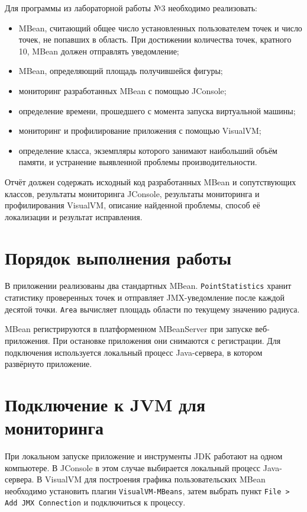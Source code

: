 \documentclass[a4paper,14pt]{extarticle}
\begin{document}
Для программы из лабораторной работы №3 необходимо реализовать:
\begin{itemize}
    \item MBean, считающий общее число установленных пользователем точек и число точек, не попавших в область. При достижении количества точек, кратного 10, MBean должен отправлять уведомление;
    \item MBean, определяющий площадь получившейся фигуры;
    \item мониторинг разработанных MBean с помощью JConsole;
    \item определение времени, прошедшего с момента запуска виртуальной машины;
    \item мониторинг и профилирование приложения с помощью VisualVM;
    \item определение класса, экземпляры которого занимают наибольший объём памяти, и устранение выявленной проблемы производительности.
\end{itemize}

Отчёт должен содержать исходный код разработанных MBean и сопутствующих классов, результаты мониторинга JConsole, результаты мониторинга и профилирования VisualVM, описание найденной проблемы, способ её локализации и результат исправления.

\section{Порядок выполнения работы}

В приложении реализованы два стандартных MBean. \texttt{PointStatistics} хранит статистику проверенных точек и отправляет JMX-уведомление после каждой десятой точки. \texttt{Area} вычисляет площадь области по текущему значению радиуса.

MBean регистрируются в платформенном MBeanServer при запуске веб-приложения. При остановке приложения они снимаются с регистрации. Для подключения используется локальный процесс Java-сервера, в котором развёрнуто приложение.

\section{Подключение к JVM для мониторинга}

При локальном запуске приложение и инструменты JDK работают на одном компьютере. В JConsole в этом случае выбирается локальный процесс Java-сервера. В VisualVM для построения графика пользовательских MBean необходимо установить плагин \texttt{VisualVM-MBeans}, затем выбрать пункт \texttt{File > Add JMX Connection} и подключиться к процессу.
\end{document}
